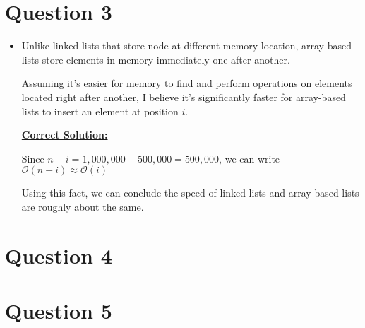\documentclass[12pt]{article}
\begin{document}
\section*{Question 3}
\begin{itemize}
    \item

    Unlike linked lists that store node at different memory location, array-based
    lists store elements in memory immediately one after another.

    \bigskip

    Assuming it's easier for memory to find and perform operations on elements
    located right after another, I believe it's significantly faster for
    array-based lists to insert an element at position $i$.

    \bigskip

    \begin{mdframed}
        \underline{\textbf{Correct Solution:}}

        \bigskip

        \color{red}
        Since $n - i = 1,000,000 - 500,000 = 500,000$, we can write
        $\mathcal{O}(n-i) \approx \mathcal{O}(i)$

        \bigskip

        Using this fact, we can conclude the speed of linked lists and array-based
        lists are roughly about the same.
        \color{black}
    \end{mdframed}

\end{itemize}

\section*{Question 4}

\section*{Question 5}
\end{document}
